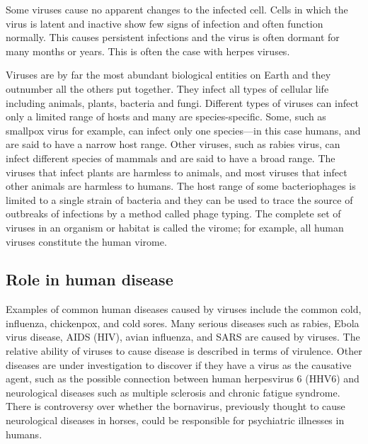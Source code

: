 Some viruses cause no apparent changes to the infected cell. Cells in which the virus is latent and inactive show few signs of infection and often function normally. This causes persistent infections and the virus is often dormant for many months or years. This is often the case with herpes viruses.

Viruses are by far the most abundant biological entities on Earth and they outnumber all the others put together. They infect all types of cellular life including animals, plants, bacteria and fungi. Different types of viruses can infect only a limited range of hosts and many are species-specific. Some, such as smallpox virus for example, can infect only one species---in this case humans, and are said to have a narrow host range. Other viruses, such as rabies virus, can infect different species of mammals and are said to have a broad range. The viruses that infect plants are harmless to animals, and most viruses that infect other animals are harmless to humans. The host range of some bacteriophages is limited to a single strain of bacteria and they can be used to trace the source of outbreaks of infections by a method called phage typing. The complete set of viruses in an organism or habitat is called the virome; for example, all human viruses constitute the human virome.

\hypertarget{role-in-human-disease}{%
\subsection{Role in human disease}\label{role-in-human-disease}}

Examples of common human diseases caused by viruses include the common cold, influenza, chickenpox, and cold sores. Many serious diseases such as rabies, Ebola virus disease, AIDS (HIV), avian influenza, and SARS are caused by viruses. The relative ability of viruses to cause disease is described in terms of virulence. Other diseases are under investigation to discover if they have a virus as the causative agent, such as the possible connection between human herpesvirus 6 (HHV6) and neurological diseases such as multiple sclerosis and chronic fatigue syndrome. There is controversy over whether the bornavirus, previously thought to cause neurological diseases in horses, could be responsible for psychiatric illnesses in humans.

